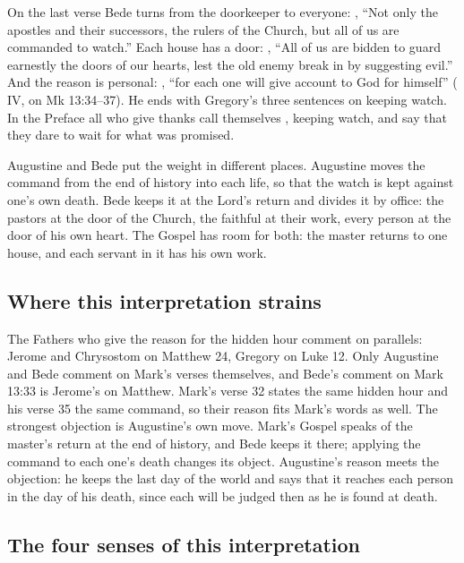 On the last verse Bede turns from the doorkeeper to everyone: , ``Not only the apostles and their successors,
the rulers of the Church, but all of us are commanded to watch.'' Each house
has a door: , ``All of us are bidden to
guard earnestly the doors of our hearts, lest the old enemy break in by
suggesting evil.'' And the reason is personal: , ``for each one will give account to God for himself''
( IV, on Mk 13:34--37). He ends with
Gregory's three sentences on keeping watch. In the Preface all who give
thanks call themselves , keeping watch, and say that they
dare to wait for what was promised.

Augustine and Bede put the weight in different places. Augustine moves the
command from the end of history into each life, so that the watch is kept
against one's own death. Bede keeps it at the Lord's return and divides it by
office: the pastors at the door of the Church, the faithful at their work,
every person at the door of his own heart. The Gospel has room for both: the
master returns to one house, and each servant in it has his own work.

\subsection{Where this interpretation strains}

The Fathers who give the reason for the hidden hour comment on parallels:
Jerome and Chrysostom on Matthew 24, Gregory on Luke 12. Only Augustine and
Bede comment on Mark's verses themselves, and Bede's comment on Mark 13:33 is
Jerome's on Matthew. Mark's verse 32 states the same hidden hour and his
verse 35 the same command, so their reason fits Mark's words as well. The strongest
objection is Augustine's own move. Mark's Gospel speaks of the master's
return at the end of history, and Bede keeps it there; applying the command
to each one's death changes its object. Augustine's reason meets the
objection: he keeps the last day of the world and says that it reaches each
person in the day of his death, since each will be judged then as he is
found at death.

\subsection{The four senses of this interpretation}

